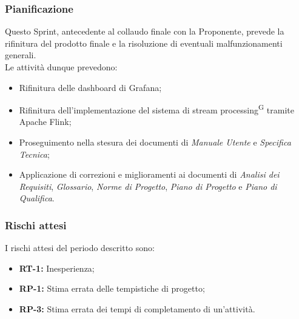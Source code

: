 \documentclass[8pt]{article}
\newcommand{\glossterm}[1]{#1\textsuperscript{G}} %
\begin{document}
\subsubsection{Pianificazione}
Questo Sprint, antecedente al collaudo finale con la Proponente, prevede la rifinitura del prodotto finale e la risoluzione di eventuali malfunzionamenti generali.\\Le attività dunque prevedono:
\begin{itemize}
    \item{Rifinitura delle dashboard di Grafana;}
    \item{Rifinitura dell'implementazione del sistema di \glossterm{stream processing} tramite Apache Flink;}
    \item Proseguimento nella stesura dei documenti di \textit{Manuale Utente} e \textit{Specifica Tecnica};
    \item Applicazione di correzioni e miglioramenti ai documenti di \textit{Analisi dei Requisiti}, \textit{Glossario}, \textit{Norme di Progetto}, \textit{Piano di Progetto} e \textit{Piano di Qualifica}.
\end{itemize} 
\subsubsection{Rischi attesi}
I rischi attesi del periodo descritto sono:
\begin{itemize}
    \setlength\itemsep{0em}
        \item \textbf{RT-1:} Inesperienza;
        \item \textbf{RP-1:} Stima errata delle tempistiche di progetto;
        \item \textbf{RP-3:} Stima errata dei tempi di completamento di un'attività.
    \end{itemize}
\clearpage
\end{document}

